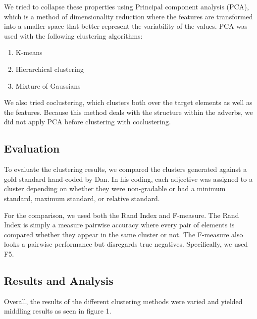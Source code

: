 \documentclass[11pt]{amsart}
\begin{document}
We tried to collapse these properties using Principal component analysis (PCA), which is a method of dimensionality reduction where the features are transformed into a smaller space that better represent the variability of the values. PCA was used with the following clustering algorithms:

\begin{enumerate}
\item K-means
\item Hierarchical clustering
\item Mixture of Gaussians
\end{enumerate}

We also tried coclustering\cite{coclustering}, which clusters both over the target elements as well as the features. Because this method deals with the structure within the adverbs, we did not apply PCA before clustering with coclustering.

\subsection{Evaluation}
To evaluate the clustering results, we compared the clusters generated against a gold standard hand-coded by Dan. In his coding, each adjective was assigned to a cluster depending on whether they were non-gradable or had a minimum standard, maximum standard, or relative standard.

For the comparison, we used both the Rand Index and F-measure\cite{irbook}. The Rand Index is simply a measure pairwise accuracy where every pair of elements is compared whether they appear in the same cluster or not. The F-measure also looks a pairwise performance but disregards true negatives. Specifically, we used F5.

\subsection{Results and Analysis}
Overall, the results of the different clustering methods were varied and yielded middling results as seen in figure 1.
\end{document}
